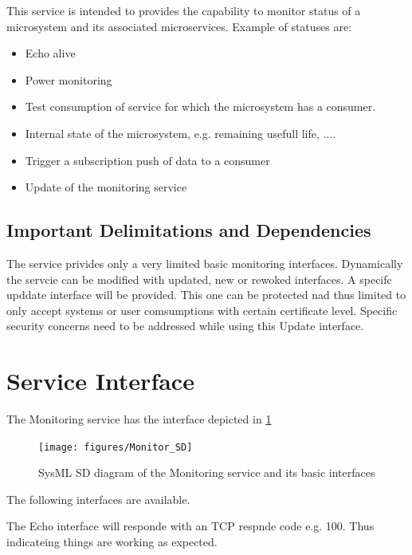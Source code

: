 \documentclass[a4paper]{arrowhead}
\begin{document}
This service is intended to provides the capability to monitor status of a
microsystem and its associated microservices. Example of statuses are:
\begin{itemize}
\item Echo alive
\item Power monitoring
\item Test consumption of service for which the microsystem has a
  consumer.
\item Internal state of the microsystem, e.g. remaining
  usefull life, ....
\item Trigger a subscription push of data to a consumer
\item Update of the monitoring service
\end{itemize}





\subsection{Important Delimitations and Dependencies}
\label{sec:delimitations}

The service privides only a very limited basic monitoring interfaces.
Dynamically the servcie can be modified with updated, new or rewoked interfaces. 
A specifc upddate interface will be provided. This one can be
protected nad thus limited to only accept systems or user comsumptions
with certain certificate level. Specific security concerns need to be
addressed while using this Update interface. 


\section{Service Interface}
\label{sec:operations}


The Monitoring service has the interface depicted in \ref{fig:SD}

\begin{figure}[h!]
  \centering
  \texttt{[image: figures/Monitor\_SD]}
  \caption{SysML SD diagram of the Monitoring service and its basic interfaces}
  \label{fig:SD}
\end{figure}

The following interfaces are available.



The Echo interface will responde with an TCP respnde code
e.g. 100. Thus indicateing things are working as expected.
\end{document}
